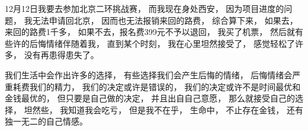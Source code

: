 12月12日我要去参加北京二环挑战赛，
而我现在身处西安，
因为项目进度的问题，
我无法申请回北京，
因而也无法报销来回的路费，
综合算下来，
如果去，来回的路费1千多，
如果不去，报名费399元不予以退回，
我买了机票，
然后就有些许的后悔情绪伴随着我，
直到某个时刻，
我在心里坦然接受了，
感觉轻松了许多，
没有再患得患失了。



我们生活中会作出许多的选择，
有些选择我们会产生后悔的情绪，
后悔情绪会严重耗费我们的精力，
我们的决定或许是错误的，
我们的决定或许不是时间最优和金钱最优的，
但只要是自己做的决定，
并且出自自己意愿，
那么就接受自己的选择，
坦然些，
我知道我会吃亏，
但是我不在乎，
生命中，
不止存在金钱，
还有独一无二的自己情感。







